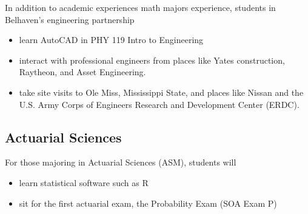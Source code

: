 In addition to academic experiences math majors experience, students in Belhaven's engineering partnership 

\begin{itemize}
    \item learn AutoCAD in PHY 119 Intro to Engineering
    \item interact with professional engineers from places like Yates construction, Raytheon, and Asset Engineering.
    \item take site visits to Ole Miss, Mississippi State, and places like Nissan and the U.S. Army Corps of Engineers Research and Development Center (ERDC).
\end{itemize}

\subsection{Actuarial Sciences}

For those majoring in Actuarial Sciences (ASM), students will

\begin{itemize}
    \item learn statistical software such as R
    \item sit for the first actuarial exam, the Probability Exam (SOA Exam P)
\end{itemize}






